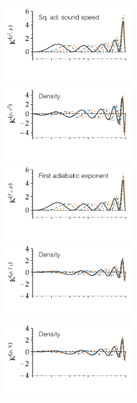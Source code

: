 \begin{figure}
    \includegraphics[width=0.5\textwidth,trim={0 1.1cm 0 0}, clip]{figs/pulse/kernels/kernel-ell-c2_rho-diffusion.pdf}%
    \includegraphics[width=0.5\textwidth,trim={0 1.1cm 0 0}, clip]{figs/pulse/kernels/kernel-ell-rho_c2-diffusion.pdf}\\
    \includegraphics[width=0.5\textwidth,trim={0 1.1cm 0 0}, clip]{figs/pulse/kernels/kernel-ell-Gamma1_rho-diffusion.pdf}%
    \includegraphics[width=0.5\textwidth,trim={0 1.1cm 0 0}, clip]{figs/pulse/kernels/kernel-ell-rho_Gamma1-diffusion.pdf}\\
    \includegraphics[width=0.5\textwidth,trim={0 1.1cm 0 0}, clip]{figs/pulse/kernels/kernel-ell-rho_Y-diffusion.pdf}%

\end{figure}
